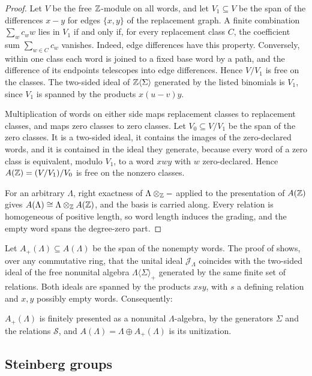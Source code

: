 \begin{proof}
Let $V$ be the free $\mathbb Z$-module on all words, and let $V_1\subseteq V$ be the span of the differences $x-y$ for edges
$\{x,y\}$ of the replacement graph. A finite combination $\sum_w c_ww$ lies in $V_1$ if and only if, for every
replacement class $C$, the coefficient sum $\sum_{w\in C}c_w$ vanishes. Indeed, edge differences have this property. Conversely, within one class each word is
joined to a fixed base word by a path, and the difference of its endpoints telescopes into edge differences. Hence $V/V_1$
is free on the classes. The two-sided ideal of $\mathbb Z\langle\Sigma\rangle$ generated by the listed binomials is $V_1$, since
$V_1$ is spanned by the products $x(u-v)y$.

Multiplication of words on either side maps replacement classes to replacement classes, and maps zero classes to zero
classes. Let $V_0\subseteq V/V_1$ be the span of the zero classes. It is a two-sided ideal, it contains the images of the
zero-declared words, and it is contained in the ideal they generate, because every word of a zero class is equivalent,
modulo $V_1$, to a word $xwy$ with $w$ zero-declared. Hence $A(\mathbb Z)=(V/V_1)/V_0$ is free on the nonzero classes.

For an arbitrary $\Lambda$, right exactness of $\Lambda\otimes_{\mathbb Z}-$ applied to the presentation of $A(\mathbb Z)$ gives
$A(\Lambda)\cong\Lambda\otimes_{\mathbb Z}A(\mathbb Z)$, and the basis is carried along. Every relation is homogeneous of positive
length, so word length induces the grading, and the empty word spans the degree-zero part.
\end{proof}

Let $A_+(\Lambda)\subseteq A(\Lambda)$ be the span of the nonempty words. The proof of \cite[Corollary~3.8]{OAI247periodic}
shows, over any commutative ring, that the unital ideal $\mathcal J_\Lambda$ coincides with the two-sided ideal of the free
nonunital algebra $\Lambda\langle\Sigma\rangle_+$ generated by the same finite set of relations. Both ideals are spanned
by the products $xsy$, with $s$ a defining relation and $x,y$ possibly empty words. Consequently:

\begin{lemma}\label{lem:nonunital}
$A_+(\Lambda)$ is finitely presented as a nonunital $\Lambda$-algebra, by the generators $\Sigma$ and the relations
$\mathcal S$, and $A(\Lambda)=\Lambda\oplus A_+(\Lambda)$ is its unitization.
\end{lemma}

\subsection{Steinberg groups}

